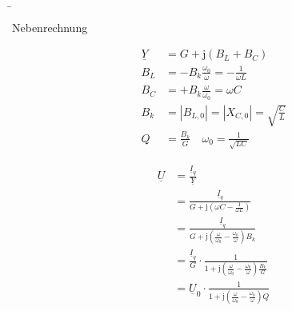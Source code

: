\b{
\begin{frame}{Nebenrechnung}
\begin{minipage}{0.3\textwidth}
    \begin{align*}
        \underline{Y} &= G + \mathrm{j}(B_L + B_C) \\
        B_L &= -B_k \frac{\omega_0}{\omega} = -\frac{1}{\omega L}\\
        B_C &= +B_k \frac{\omega}{\omega_0} = \omega C \\
        B_k &= |B_{L,0}| = |X_{C,0}| = \sqrt{\frac{C}{L}}\\
        Q &= \frac{B_k}{G} \quad \omega_0 = \frac{1}{\sqrt{LC}}
    \end{align*}
\end{minipage}\hfill%
\begin{minipage}{0.65\textwidth}\centering
    \begin{align*}
        \underline{U} &= \frac{\underline{I}_q}{\underline{Y}} \\
        &= \frac{\underline{I}_q}{G + \mathrm{j}\left(\omega C - \frac{1}{\omega L}\right)} \\
        &= \frac{\underline{I}_q}{G + \mathrm{j}\left(\frac{\omega}{\omega_0} - \frac{\omega_0}{\omega}\right)B_k} \\
        &= \frac{\underline{I}_q}{G} \cdot \frac{1}{1 + \mathrm{j}\left(\frac{\omega}{\omega_0} - \frac{\omega_0}{\omega}\right)\frac{B_k}{G}} \\
        &= \underline{U}_0 \cdot \frac{1}{1 + \mathrm{j}\left(\frac{\omega}{\omega_0} - \frac{\omega_0}{\omega}\right)Q}
    \end{align*}
\end{minipage}
\end{frame}
}


